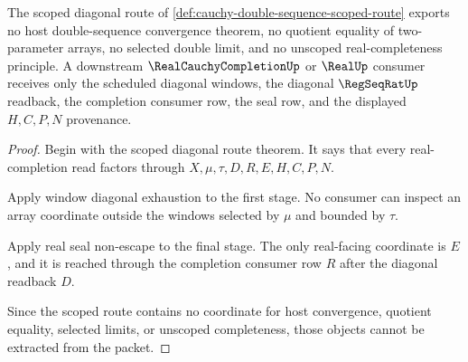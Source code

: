 \begin{theorem}
\label{thm:cauchy-double-sequence-scoped-nonescape}
The scoped diagonal route of \autoref{def:cauchy-double-sequence-scoped-route} exports no host double-sequence convergence theorem, no quotient equality of two-parameter arrays, no selected double limit, and no unscoped real-completeness principle. A downstream $\RealCauchyCompletionUp$ or $\RealUp$ consumer receives only the scheduled diagonal windows, the diagonal $\RegSeqRatUp$ readback, the completion consumer row, the seal row, and the displayed $H,C,P,N$ provenance.
\end{theorem}
\begin{proof}
Begin with the scoped diagonal route theorem. It says that every real-completion read factors through $X,\mu,\tau,D,R,E,H,C,P,N$.

Apply window diagonal exhaustion to the first stage. No consumer can inspect an array coordinate outside the windows selected by $\mu$ and bounded by $\tau$.

Apply real seal non-escape to the final stage. The only real-facing coordinate is $E$, and it is reached through the completion consumer row $R$ after the diagonal readback $D$.

Since the scoped route contains no coordinate for host convergence, quotient equality, selected limits, or unscoped completeness, those objects cannot be extracted from the packet.
\end{proof}

